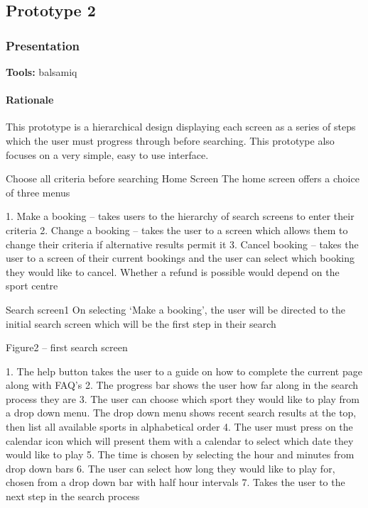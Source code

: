 \subsection{Prototype 2}

\subsubsection{Presentation}
\textbf{Tools:} balsamiq

\paragraph{Rationale}
This prototype is a hierarchical design displaying each screen as a series of
steps which the user must progress through before searching. This prototype
also focuses on a very simple, easy to use interface.

Choose all criteria before searching
Home Screen
The home screen offers a choice of three menus


1.       Make a booking – takes users to the hierarchy of search screens to enter their criteria
2.       Change a booking – takes the user to a screen which allows them to change their criteria if alternative results permit it
3.       Cancel booking – takes the user to a screen of their current bookings and the user can select which booking they would like to cancel. Whether a refund is possible would depend on the sport centre

Search screen1
On selecting ‘Make a booking’, the user will be directed to the initial search screen which will be the first step in their search

Figure2 – first search screen

1.       The help button takes the user to a guide on how to complete the current page along with FAQ’s
2.       The progress bar shows the user how far along in the search process they are
3.       The user can choose which sport they would like to play from a drop down menu. The drop down menu shows recent search results at the top, then list all available sports in alphabetical order
4.       The user must press on the calendar icon which will present them with a calendar to select which date they would like to play
5.       The time is chosen by selecting the hour and minutes from drop down bars
6.       The user can select how long they would like to play for, chosen from a drop down bar with half hour intervals
7.       Takes the user to the next step in the search process

